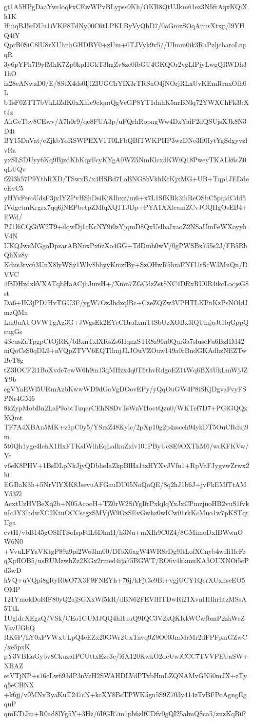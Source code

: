 gt1A5HPgDaaYwcloqkxCEwWPvBLypss0Kh/OKB8QtUJkm61ez3N5frAqxKQiXh1K
HiuqBJ5rDUu1iVKF8TdNy00C6tLPKLByVyQhD7/0oGmzSOqAimsXtxp/l9YHQ4fY
QprB0SiC8lU8rXUhnhGHDBY0+zUm+0TJVyk9v5//UImm0ik3RaPzljcbaroLnpqR
3y6pYPh7I9yfMhK7Zp0kpHGkT3hgZv8ze0fbGU4GKQOr2vgLlPjyLwgQRWDh31hO
iz28eANwzD0/E/8StX4ds0IjlZIUGChYIX3rTRSuO4jNOrjRLxUvKEmRraxOfh0L
bTsF0ZTT7bVkLlZdK0xXhlc9clqmQgVcGP8YT1dnhK5nrBNlq72YWXChFk3bXtJz
AkGcTby8CEwv/A7h0r9/qe8FUA3p/uFQrhRopngWw4DxYaiF2dQSUjsXJk8N3D4t
BY15DnVat/eZjkbYoRSWPEXV1T0LFbQBfTWKPHP3wzDNe3If0IytYgSdgyvzlvRa
yxSLSDUyy6Kq9BjzdKhKqyFcyKYgA0WZ5NmKlcx3KWiQ18PweyTKALk6cZ0qLUQv
fZ93h57P9YtbRXD/TSwxB/x4HSBd7LoBNG8hVkhKtKjxMG+UB+Tqp1JEDdeeEvC5
yHYvFeroUdsF3jxIYZPvHShDsiKj8Jhxz/m6+x7L1SfKRk3ihReOSbC5paidCdd5
IVdgctmKrgrx7qq6jNEPbctpZMfqXQ1TJDp+PYA1XXlcamZCvJGQHgOsEB4+EWd/
PJ1l6CQGiW2T9+dqwDj1cKcNY9i0zYjqmD8QxUslhaIxaoZ2NSaUmFeWXoyyhV4N
UKQJweMGgoDpzarABNuxPx6zXo4GG+TdDmb0wV/0gPWSBx755s2J/FB5RbQhXz8y
Kdus3rvc63UnX8lyWSy1Wlv8bhyyKmzfBy+SzOHwR5hraFNFl1rScW3MuQn/DVVC
4f8DHzdxkVXATqbHaACjhJursH+/Xmn7ZGCdzZst8NC4DRxRU0R4ikcLocjsG8st
Da6+IK3jPD7HvTGU3F/ygW7OzJhdzqlBc+CzeZQZw3VPHTLKPnKzPsNOldJmzQMn
Lm0uAUOVWTgAg3G+JWgsEk2EYeCBraIxmTtSbUzXOBx3lQUmjaJt1lqGppQcugGs
4ScusZaTpgpCtOjRK/bBxnTxlXRsZs6HqnzSTR8z96n0Qur3a7sluseFu6BzHM42
niQoCsS0qDL9+nVQpZTVV6EQTlhnjJLJOuVZOuw149a0rBndGKAdhzNEZTwBcT8g
tZ3IOCF2i1BoXvde7ewW6h9m13qMHzx4q0T6thvRdgoEZ1tWq6BXtUkLmWjJZY9b
cgVYaEWl5URmAzbKwwWD9dGoVgDOovEPy/yQqOuGW4P8iSKjDgvaFvyFSPNr4GM6
8kZypMobBn2LaP9obtTuqcrCEhN8DvTsWnVHoctQzu0/WKTef7D7+PGlGQQzKQmt
TF7A4XBAn5MK+z1pC0y5/YSrzZ48Kylc/2pXp10g2p4zscch94ykDT5OuCRduj9m
5t6Qh1yge4IehX1HxFTKsIWlhEqLaIkuZxlv101PByUcSE9OXThM6/wcKFKVw/Yc
v6eK8PHV+1BsDLpNkJjyQDbheIaZkpBlHa1tzHYXvJVfu1+RpVaFJygvwZrwx2hi
EGBaK3h+5NrVlYXK8JsevuAFGauDU05NoQoQE/8q2hJ1b6J+jvFkEMfTtAMY53Zl
AcxtUzHVBeXq2b+N05AcooH+TZ0rW2SiYgIfrPxkjlqYxJxCPmzjuoHB2vuS1fvk
nIc3Y3lhdwXC2KtuOCCscgzSMVjW9OzSEvGwhz0wICw01rkKcMuo1w7pKSTqtUga
cvtH/vbB145gOSIfTSoIspFdL6DhnH/h3Nu+mXIh9C0Z4/8GMimoDxIBWwnOW6N0
+VvuLFYaVKtgP89z9pi2Wo3lm00/DIbX6agW4WR8rDg9ItLofXCnyb4wfIi1lcFz
qXpfIOB5/nsRUMzwhZz2KGx2rmed4ija75BGWT/RO6v4kkmuKA3OUXNOi5cPd3wD
hVQ+uVQpi8gRyR0sO7X3F9FNEYh+76j/kFjt3e9Bi+vgjUCY1QcrXUxhseEO5OMP
121YmokDoRfF80yQ2ajSGXxWf5kR/dBN62FEVlHTDwRi21XvnHHhrhtzMSsA5TtL
1UgldeXEgzQ/VSk/CEo1GUMJQQ4hHuuQ9IQC3V2xQKKkWCwfbmP2zhWcZYavUGbQ
RK6P/LY0xPVWxULpQ4eEZx20GWr2UxTnvq9Z9O003mMrMr2dFPFpmGZwC/xe5pxK
pY3VBEaGybv8CkuzaIPCUttxEze3e/i6X120KwkO2deUwlCCC7TVVPEUaSW+NBAZ
etVTjNP+s16cLw693dP3nVzH2SWAHDLVdPTxbHmLZQNAMvGK50mJX+zTyq5eCBNX
+k6jj/v0MNvByaKuT247cN+kcXY8BcTPWK5gn5S9Z703y414zTvBFPoAgngEgquP
qmETiJm+R0ad8lYg5Y+3Hz/6IfGR7m1ph6zlfCDfv0gQI25almQ8ca5/znzKqBiF
